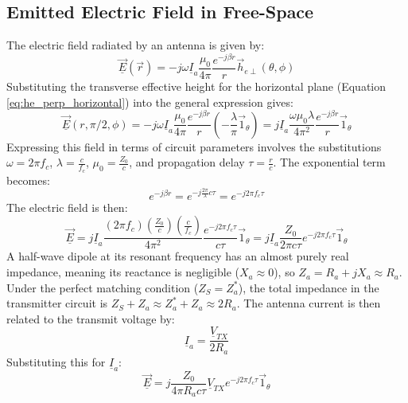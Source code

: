 \subsection{Emitted Electric Field in Free-Space}
The electric field radiated by an antenna is given by:
\begin{equation}
	\underline{\vec{E}}(\vec{r}) = -j\omega \underline{I}_a \frac{\mu_0}{4\pi} \frac{e^{-j\beta r}}{r} \vec{h}_{e\perp}(\theta, \phi)
\end{equation}
\vspace{0.5em}
Substituting the transverse effective height for the horizontal plane (Equation \ref{eq:he_perp_horizontal}) into the general expression gives:
\begin{equation}
	\underline{\vec{E}}(r, \pi/2, \phi) = -j\omega \underline{I}_a \frac{\mu_0}{4\pi} \frac{e^{-j\beta r}}{r} \left(-\frac{\lambda}{\pi} \vec{1}_\theta\right) = j \underline{I}_a \frac{\omega \mu_0 \lambda}{4\pi^2} \frac{e^{-j\beta r}}{r} \vec{1}_\theta
\end{equation}
\vspace{0.5em}
Expressing this field in terms of circuit parameters involves the substitutions $\omega = 2\pi f_c$, $\lambda = \frac{c}{f_c}$, $\mu_0 = \frac{Z_0}{c}$, and propagation delay $\tau = \frac{r}{c}$. The exponential term becomes:
\begin{equation}
	e^{-j\beta r} = e^{-j\frac{2\pi}{\lambda}c\tau} = e^{-j2\pi f_c \tau}
\end{equation}
\vspace{0.5em}
The electric field is then:
\begin{equation}
	\underline{\vec{E}} = j \underline{I}_a \frac{(2\pi f_c) (\frac{Z_0}{c}) (\frac{c}{f_c})}{4\pi^2} \frac{e^{-j2\pi f_c \tau}}{c\tau} \vec{1}_\theta = j \underline{I}_a \frac{Z_0}{2\pi c\tau} e^{-j2\pi f_c \tau} \vec{1}_\theta
\end{equation}
\vspace{0.5em}
A half-wave dipole at its resonant frequency has an almost purely real impedance, meaning its reactance is negligible ($X_a \approx 0$), so $Z_a = R_a + jX_a \approx R_a$. Under the perfect matching condition ($Z_S = Z_a^*$), the total impedance in the transmitter circuit is $Z_S + Z_a \approx Z_a^* + Z_a \approx 2R_a$. The antenna current is then related to the transmit voltage by:
\begin{equation}
	\underline{I}_a = \frac{\underline{V}_{TX}}{2R_a}
\end{equation}
\vspace{0.5em}
Substituting this for $\underline{I}_a$:
\begin{equation}
	\boxed{\underline{\vec{E}} = j \frac{Z_0}{4\pi R_a c\tau} \underline{V}_{TX} e^{-j2\pi f_c \tau} \vec{1}_\theta}
	\label{eq:E_field_final}
\end{equation}

